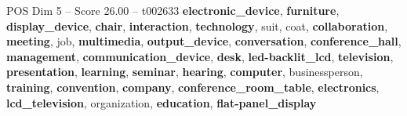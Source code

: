 \begin{textsample}{POS Dim 5 – Score 26.00 – t002633}  \label{ex:f5_pos_034}
\textbf{electronic\_device}, \textbf{furniture}, \textbf{display\_device}, \textbf{chair}, \textbf{interaction}, \textbf{technology}, suit, coat, \textbf{collaboration}, \textbf{meeting}, job, \textbf{multimedia}, \textbf{output\_device}, \textbf{conversation}, \textbf{conference\_hall}, \textbf{management}, \textbf{communication\_device}, \textbf{desk}, \textbf{led-backlit\_lcd}, \textbf{television}, \textbf{presentation}, \textbf{learning}, \textbf{seminar}, \textbf{hearing}, \textbf{computer}, businessperson, \textbf{training}, \textbf{convention}, \textbf{company}, \textbf{conference\_room\_table}, \textbf{electronics}, \textbf{lcd\_television}, organization, \textbf{education}, \textbf{flat-panel\_display}

\end{textsample}
